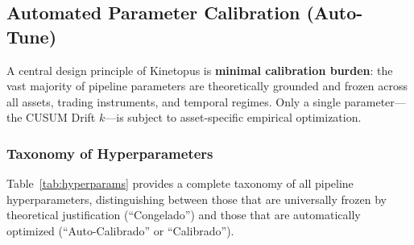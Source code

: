 \documentclass[11pt,a4paper]{article}
\begin{document}
\subsection{Automated Parameter Calibration (Auto-Tune)}
\label{sec:param_calibration}
A central design principle of Kinetopus is \textbf{minimal calibration burden}: the vast majority of pipeline parameters are theoretically grounded and frozen across all assets, trading instruments, and temporal regimes. Only a single parameter---the CUSUM Drift $k$---is subject to asset-specific empirical optimization.

\subsubsection{Taxonomy of Hyperparameters}
Table~\ref{tab:hyperparams} provides a complete taxonomy of all pipeline hyperparameters, distinguishing between those that are universally frozen by theoretical justification (``Congelado'') and those that are automatically optimized (``Auto-Calibrado'' or ``Calibrado'').
\end{document}
